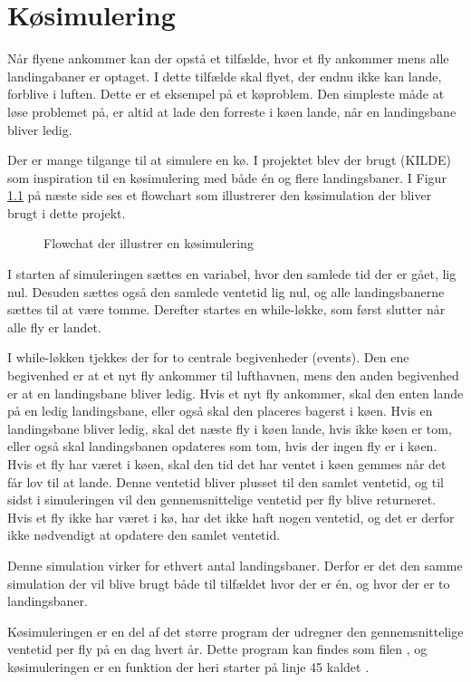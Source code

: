 \chapter{Køsimulering} \label{chap:queue}
Når flyene ankommer kan der opstå et tilfælde, hvor et fly ankommer mens alle landingabaner er optaget.
I dette tilfælde skal flyet, der endnu ikke kan lande, forblive i luften.
Dette er et eksempel på et køproblem. Den simpleste måde at løse problemet på, er altid at lade den forreste i køen lande, når en landingsbane bliver ledig.

Der er mange tilgange til at simulere en kø. I projektet blev der brugt (KILDE) som inspiration til en køsimulering med både én og flere landingsbaner.
I Figur \ref{fig:queue_flowchart} på næste side ses et flowchart som illustrerer den køsimulation der bliver brugt i dette projekt.

\begin{figure}
	\centering
	\scalebox{0.7}{
		
	}
	\caption{Flowchat der illustrer en køsimulering} \label{fig:queue_flowchart}
\end{figure}

I starten af simuleringen sættes en variabel, hvor den samlede tid der er gået, lig nul.
Desuden sættes også den samlede ventetid lig nul, og alle landingsbanerne sættes til at være tomme. Derefter startes en while-løkke, som først slutter når alle fly er landet.

I while-løkken tjekkes der for to centrale begivenheder (events).
Den ene begivenhed er at et nyt fly ankommer til lufthavnen, mens den anden begivenhed er at en landingsbane bliver ledig.
Hvis et nyt fly ankommer, skal den enten lande på en ledig landingsbane, eller også skal den placeres bagerst i køen.
Hvis en landingsbane bliver ledig, skal det næste fly i køen lande, hvis ikke køen er tom, eller også skal landingsbanen opdateres som tom, hvis der ingen fly er i køen.
Hvis et fly har været i køen, skal den tid det har ventet i køen gemmes når det får lov til at lande. Denne ventetid bliver plusset til den samlet ventetid, og til sidst i simuleringen vil den gennemsnittelige ventetid per fly blive returneret. 
Hvis et fly ikke har været i kø, har det ikke haft nogen ventetid, og det er derfor ikke nødvendigt at opdatere den samlet ventetid.

Denne simulation virker for ethvert antal landingsbaner.
Derfor er det den samme simulation der vil blive brugt både til tilfældet hvor der er én, og hvor der er to landingsbaner.

Køsimuleringen er en del af det større program der udregner den gennemsnittelige ventetid per fly på en dag hvert år.
Dette program kan findes som filen , og køsimuleringen er en funktion der heri starter på linje 45 kaldet .
